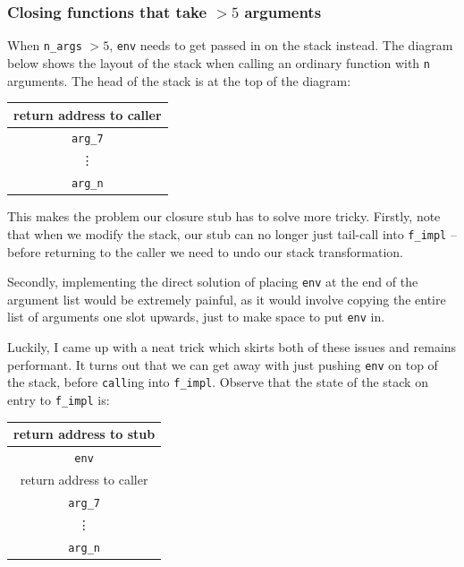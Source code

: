 \documentclass[12pt,a4paper,twoside,openright]{report}
\begin{document}
\subsubsection{Closing functions that take $> 5$ arguments}

When \lstinline!n_args! $> 5$, \lstinline!env! needs to get passed in on the
stack instead. The diagram below shows the layout of the stack when calling an ordinary
function with \lstinline!n! arguments. The head of the stack is at the top of the diagram:

\begin{center}
\begin{tabular}{c}
  return address to caller
  \\ \hline
  \lstinline!arg_7!
  \\ \hline
  \vdots
  \\ \hline
  \lstinline!arg_n!
\end{tabular}
\end{center}

This makes the problem our closure stub has to solve more tricky. Firstly, note
that when we modify the stack, our stub can no longer just tail-call into
\lstinline!f_impl! -- before returning to the caller we need to undo our stack
transformation.

Secondly, implementing the direct solution of placing \lstinline!env! at the end of the
argument list would be extremely painful, as it would involve copying the entire
list of arguments one slot upwards, just to make space to put \lstinline!env! in.

Luckily, I came up with a neat trick which skirts both of these issues and remains
performant. It turns out that we can get away with just pushing \lstinline!env!
on top of the stack, before \lstinline!call!ing into
\lstinline!f_impl!. Observe that the state of the stack on entry to \lstinline!f_impl! is:

\begin{center}
\begin{tabular}{c}
  return address to stub
  \\ \hline
  \lstinline!env!
  \\ \hline
  return address to caller
  \\ \hline
  \lstinline!arg_7!
  \\ \hline
  \vdots
  \\ \hline
  \lstinline!arg_n!
\end{tabular}
\end{center}
\end{document}
